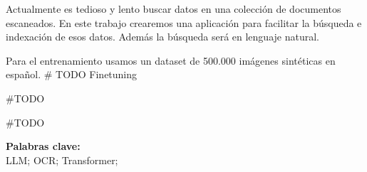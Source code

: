 \documentclass[../main.tex]{subfiles}
\begin{document}

Actualmente es tedioso y lento buscar datos en una colección de documentos escaneados.
En este trabajo crearemos una aplicación para facilitar la búsqueda e indexación de esos datos.
Además la búsqueda será en lenguaje natural.

Para el entrenamiento usamos un dataset de 500.000 imágenes sintéticas en español.
\# TODO Finetuning

\#TODO

\#TODO

%
%

\noindent \textbf{Palabras clave:}\\
\noindent LLM; OCR; Transformer;
\end{document}
